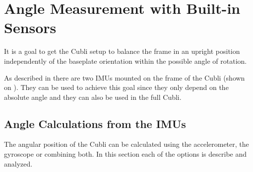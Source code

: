 \chapter{Angle Measurement with Built-in Sensors}\label{chap:CompFilter}
It is a goal to get the Cubli setup to balance the frame in an upright position independently of the baseplate orientation within the possible angle of rotation.

As described in  there are two IMUs mounted on the frame of the Cubli (shown on ). They can be used to achieve this goal since they only depend on the absolute angle and they can also be used in the full Cubli.

\section{Angle Calculations from the IMUs}
The angular position of the Cubli can be calculated using the accelerometer, the gyroscope or combining both. In this section each of the options is describe and analyzed.

